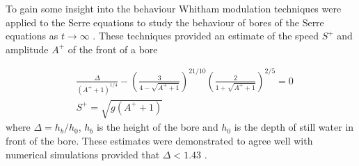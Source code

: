 To gain some insight into the behaviour Whitham modulation techniques were applied to the Serre equations to study the behaviour of bores of the Serre equations as $t \rightarrow \infty$ \cite{El-etal-2006}. These techniques provided an estimate of the speed $S^+$ and amplitude $A^+$ of the front of a bore

\begin{subequations}
	\begin{align}
	&\frac{\Delta}{\left(A^+ + 1\right)^{1/4}} - \left(\frac{3}{4 -  \sqrt{A^+ + 1}}\right)^{21/10} \left(\frac{2}{1 + \sqrt{A^+ + 1}}\right)^{2/5} = 0	\label{eqn:Aplusdef} \\
	&S^+ = \sqrt{g \left(A^+ + 1\right)}	\label{eqn:Splusdef}
	\end{align}
	\label{eqn:ELWhitMod}	
\end{subequations}
where $\Delta = h_b / h_0$, $h_b$ is the height of the bore and $h_0$ is the depth of still water in front of the bore. These estimates were demonstrated to agree well with numerical simulations provided that $\Delta < 1.43$ \cite{El-etal-2006}.